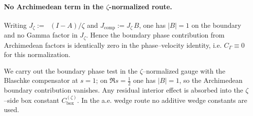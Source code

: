 \documentclass[11pt]{article}
\theoremstyle{definition}
\theoremstyle{remark}
\theoremstyle{definition}
\DeclareMathOperator{\dettwo}{det_2}
\begin{document}
\paragraph{No Archimedean term in the \(\zeta\)-normalized route.}
Writing \(J_\zeta:=\dettwo(I-A)/\zeta\) and \(J_{\mathrm{comp}}:=J_\zeta\,B\), one has \(|B|=1\) on the boundary and no Gamma factor in \(J_\zeta\). Hence the boundary phase contribution from Archimedean factors is identically zero in the phase–velocity identity, i.e. \(C_\Gamma\equiv 0\) for this normalization.

We carry out the boundary phase test in the $\zeta$–normalized gauge with the Blaschke compensator at $s=1$; on $\Re s=\tfrac12$ one has $|B|=1$, so the Archimedean boundary contribution vanishes. Any residual interior effect is absorbed into the $\zeta$–side box constant $C_{\mathrm{box}}^{(\zeta)}$. In the a.e. wedge route no additive wedge constants are used.
\end{document}
